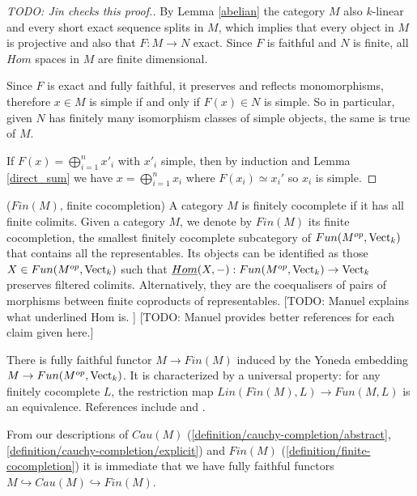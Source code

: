 \begin{proof}
  [TODO: Jin checks this proof.]

  By Lemma \ref{abelian} the category $M$ also $k$-linear and every short exact sequence splits in $M$, which implies that every object in $M$ is projective and also that $F:M\to N$ exact. Since $F$ is faithful and $N$ is finite, all $Hom$ spaces in $M$ are finite dimensional.

  Since $F$ is exact and fully faithful, it preserves and reflects
  monomorphisms, therefore $x\in M$ is simple if and only if $F(x)\in N$ is
  simple. So in particular, given $N$ has finitely many isomorphism classes of
  simple objects, the same is true of $M$.

  If $F(x)=\bigoplus_{i=1}^n x'_i$ with $x'_i$ simple, then by induction and
  Lemma \ref{direct_sum} we have $x=\bigoplus_{i=1}^n x_i$ where
  $F(x_i)\simeq x_i'$ so $x_i$ is simple.
\end{proof}

\begin{definition} \label{definition/finite-cocompletion} ($Fin(M)$, finite cocompletion)
  A category $M$ is finitely cocomplete if it has all finite colimits. Given a
  category $M$, we denote by $Fin(M)$ its finite cocompletion, the
  smallest finitely cocomplete subcategory of $Fun(M^{op},\operatorname{Vect}_k)$ that
  contains all the representables. Its objects can be identified as those
  $X\in Fun(M^{op},\operatorname{Vect}_k)$ such that
  $\underline{Hom}(X,-):Fun(M^{op},\operatorname{Vect}_k)\to \operatorname{Vect}_k$ preserves filtered
  colimits. Alternatively, they are the coequalisers of pairs of morphisms
  between finite coproducts of representables. [TODO: Manuel explains what underlined Hom is. ] [TODO: Manuel provides better references for each claim given here.]

  There is fully
  faithful functor $M\to Fin(M)$ induced by the Yoneda embedding $M \to Fun(M^{op}, \operatorname{Vect}_{k})$. It is characterized by a universal
  property: for any finitely cocomplete $L$, the restriction map
  $Lin(Fin(M),L)\to Fun(M,L)$ is an equivalence. References include
  \cite[Section 5.7]{kelly/basic-concepts-enriched} and \cite[Section
  2.2.1]{lopezfranco/tensor-products}.
\end{definition}

\begin{remark}
  From our descriptions of $Cau(M)$
  (\ref{definition/cauchy-completion/abstract},
  \ref{definition/cauchy-completion/explicit}) and $Fin(M)$
  (\ref{definition/finite-cocompletion}) it is immediate that we have fully
  faithful functors $M\hookrightarrow Cau(M)\hookrightarrow Fin(M)$.
\end{remark}

